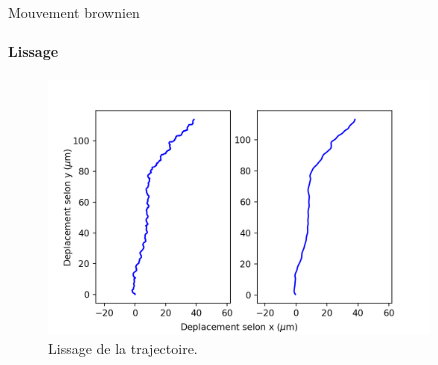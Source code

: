 \documentclass[11pt]{beamer}
\begin{document}
\begin{frame}{Mouvement brownien}
\framesubtitle{Lissage}
\begin{figure}

\includegraphics[width=0.9\textwidth]{Trajectory_lisse}
\caption{Lissage de la trajectoire.}
\end{figure}
\end{frame}
\end{document}
